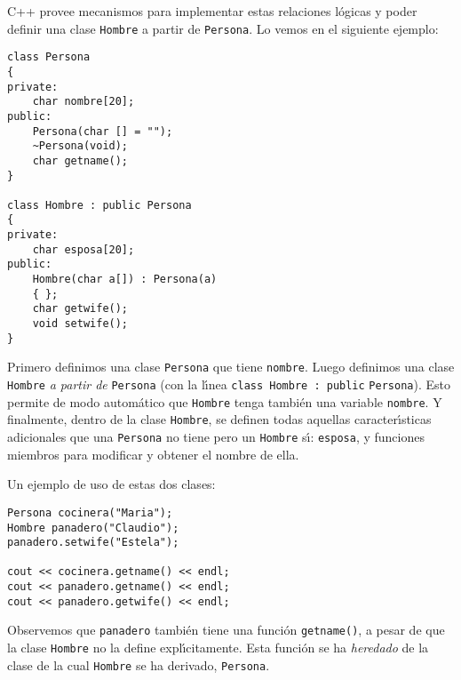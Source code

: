 C++ provee mecanismos para implementar estas relaciones l{\'o}gicas y
poder definir una clase \verb+Hombre+ a partir de \verb+Persona+. Lo
vemos en el siguiente ejemplo:

\begin{verbatim}
class Persona
{
private:
    char nombre[20];
public:
    Persona(char [] = "");
    ~Persona(void);
    char getname();
}

class Hombre : public Persona
{
private:
    char esposa[20];
public:
    Hombre(char a[]) : Persona(a)
    { };
    char getwife();
    void setwife();
}    
\end{verbatim}

Primero definimos una clase \verb+Persona+ que tiene \verb+nombre+.
Luego definimos una clase \verb+Hombre+ {\em a partir de\/}
\verb+Persona+ (con la l\'{\i}nea 
\verb+class Hombre : public+ \verb+Persona+). 
Esto permite de modo autom{\'a}tico que \verb+Hombre+ tenga
tambi{\'e}n una variable \verb+nombre+. Y finalmente, dentro de la clase
\verb+Hombre+, se definen todas aquellas caracter\'{\i}sticas
adicionales que una \verb+Persona+ no tiene pero un \verb+Hombre+
s\'{\i}: \verb+esposa+, y funciones miembros para modificar y obtener
el nombre de ella.


Un ejemplo de uso de estas dos clases:

\begin{verbatim}
Persona cocinera("Maria");
Hombre panadero("Claudio");
panadero.setwife("Estela");

cout << cocinera.getname() << endl;
cout << panadero.getname() << endl;
cout << panadero.getwife() << endl;
\end{verbatim}

Observemos que \verb+panadero+ tambi{\'e}n tiene una funci{\'o}n
\verb+getname()+, a pesar de que la clase \verb+Hombre+ no la define
expl\'{\i}citamente. Esta funci{\'o}n se ha {\em heredado\/} de la
clase de la cual \verb+Hombre+ se ha derivado, \verb+Persona+. 

